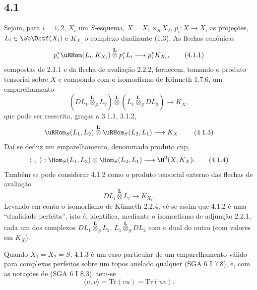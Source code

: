 \subsection*{4.1}
Sejam, para $i=1,2$, $X_i$ um $S$-esquema, $X=X_1\times_SX_2$, $p_i:X\to X_i$ as projeções, $L_i\in\ob\Dctf(X_i)$ e $K_{X_i}$ o complexo dualizante (1.3). As flechas canônicas
\begin{equation}
p_i^*\uRHom(L_i,K_{X_i})\overset{\mathbf L}{\otimes}p_i^*L_i
\longrightarrow p_i^*K_{X_i},
\tag{4.1.1}
\end{equation}
compostas de 2.1.1 e da flecha de avaliação 2.2.2, fornecem, tomando o produto tensorial sobre $X$ e compondo com o isomorfismo de Künneth 1.7.6, um emparelhamento
\begin{equation}
(DL_1\overset{\mathbf L}{\otimes}_S L_2)\overset{\mathbf L}{\otimes}(L_1\overset{\mathbf L}{\otimes}_S DL_2)
\longrightarrow K_X,
\tag{4.1.2}
\end{equation}
que pode ser reescrita, graças a 3.1.1, 3.1.2,
\begin{equation}
\uRHom_S(L_1,L_2)\overset{\mathbf L}{\otimes}\uRHom_S(L_2,L_1)
\longrightarrow K_X.
\tag{4.1.3}
\end{equation}
Daí se deduz um emparelhamento, denominado produto cup,
\begin{equation}
\langle\ ,\ \rangle:\Hom_S(L_1,L_2)\otimes\Hom_S(L_2,L_1)
\longrightarrow \H^0(X,K_X).
\tag{4.1.4}
\end{equation}
Também se pode considerar 4.1.2 como o produto tensorial externo das flechas de avaliação
\[
DL_i\overset{\mathbf L}{\otimes}L_i\longrightarrow K_{X_i}.
\]
Levando em conta o isomorfismo de Künneth 2.2.4, vê-se assim que 4.1.2 é uma ``dualidade perfeita'', isto é, identifica, mediante o isomorfismo de adjunção 2.2.1, cada um dos complexos $DL_1\overset{\mathbf L}{\otimes}_S L_2$, $L_1\overset{\mathbf L}{\otimes}_S DL_2$ com o dual do outro (com valores em $K_X$).

Quando $X_1=X_2=S$, 4.1.3 é um caso particular de um emparelhamento válido para complexos perfeitos sobre um topos anelado qualquer (SGA 6 I 7.8), e, com as notações de (SGA 6 I 8.3), tem-se
\begin{equation}
\langle u,v\rangle=\mathrm{Tr}(vu)=\mathrm{Tr}(uv).
\tag{4.1.5}
\end{equation}

